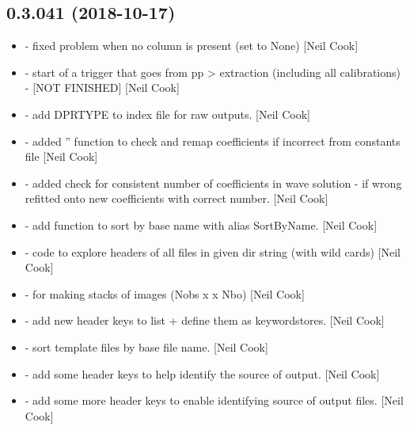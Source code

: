 \documentclass[a4paper,10pt,english]{report}
\begin{document}
\subsection{0.3.041 (2018-10-17)}
\label{\detokenize{misc/changelog:id291}}\begin{itemize}
\item {} 
 - fixed problem when no column is present (set to
None) {[}Neil Cook{]}

\item {} 
 - start of a trigger that goes from pp \textendash{}\textgreater{}
extraction (including all calibrations) - {[}NOT FINISHED{]} {[}Neil Cook{]}

\item {} 
 - add DPRTYPE to index file for raw outputs. {[}Neil
Cook{]}

\item {} 
 - added ” function to check
and remap coefficients if incorrect from constants file
 {[}Neil Cook{]}

\item {} 
  - added check for consistent number of coefficients
in wave solution - if wrong refitted onto new coefficients with
correct number. {[}Neil Cook{]}

\item {} 
 - add function to sort by base name  with
alias SortByName. {[}Neil Cook{]}

\item {} 
 - code to explore headers of all files in given dir
string (with wild cards) {[}Neil Cook{]}

\item {} 
 - for making stacks of images (Nobs x  x
Nbo) {[}Neil Cook{]}

\item {} 
 - add new header keys to list + define them as
keywordstores. {[}Neil Cook{]}

\item {} 
 - sort template files by base file name. {[}Neil
Cook{]}

\item {} 
 - add some header keys to help identify the
source of output. {[}Neil Cook{]}

\item {} 
 - add some more header keys to enable
identifying source of output files. {[}Neil Cook{]}

\end{itemize}
\end{document}
